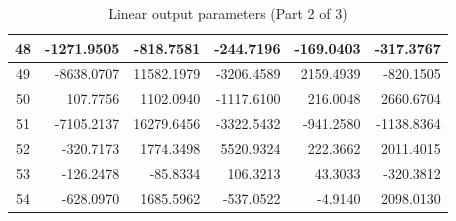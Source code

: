 \documentclass[12pt]{article}
\begin{document}
\begin{table}[H]
\begin{tabular}{|c|r|r|r|r|r|}
48 & -1271.9505 & -818.7581 & -244.7196 & -169.0403 & -317.3767 \\ \hline
49 & -8638.0707 & 11582.1979 & -3206.4589 & 2159.4939 & -820.1505 \\ \hline
50 & 107.7756 & 1102.0940 & -1117.6100 & 216.0048 & 2660.6704 \\ \hline
51 & -7105.2137 & 16279.6456 & -3322.5432 & -941.2580 & -1138.8364 \\ \hline
52 & -320.7173 & 1774.3498 & 5520.9324 & 222.3662 & 2011.4015 \\ \hline
53 & -126.2478 & -85.8334 & 106.3213 & 43.3033 & -320.3812 \\ \hline
54 & -628.0970 & 1685.5962 & -537.0522 & -4.9140 & 2098.0130 \\ \hline
\end{tabular}
\label{tab:linearBa2}
\caption{Linear output parameters (Part 2 of 3)}
\end{table}
\end{document}

